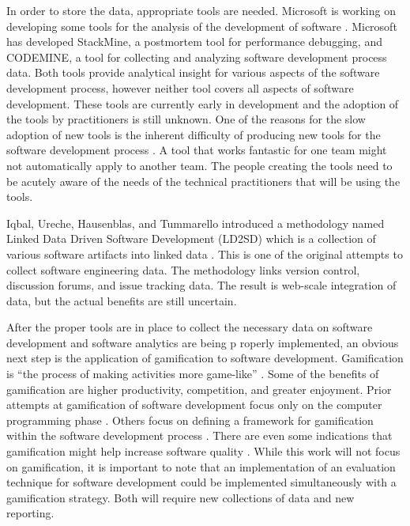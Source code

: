 \documentclass[SDSUThesis.tex]{subfiles}
\begin{document}
    In order to store the data, appropriate tools are needed.  Microsoft
    is working on developing some tools for the analysis of the development
    of software \cite{Czerwonka2013,Zhang2013}.  Microsoft has developed
    StackMine, a postmortem tool for performance debugging, and CODEMINE,
    a tool for collecting and analyzing software development process data.
    Both tools provide analytical insight for various aspects of the 
    software development process, however neither tool covers all aspects
    of software development.
    These tools are currently early in development and the adoption of the
    tools by practitioners is still unknown. One of the reasons for the slow
    adoption of new tools is the inherent difficulty of producing
    new tools for the software development process \cite{Spraragen2005}. A 
    tool that works fantastic for one team might not automatically apply to 
    another team.  The people creating the tools need to be acutely aware
    of the needs of the technical practitioners that will be using the
    tools.  
    
    Iqbal, Ureche, Hausenblas, and Tummarello introduced a methodology named
    Linked Data Driven Software Development (LD2SD) which is a collection
    of various software artifacts into linked data \cite{Iqbal2009}.  This
    is one of the original attempts to collect software engineering data.
    The methodology links version control, discussion forums, and issue tracking
    data. The result is web-scale integration of data, but the actual
    benefits are still uncertain. 

    After the proper tools are in place to collect the necessary
    data on software development and software analytics are being
    p roperly implemented, an obvious next step is the
    application of gamification to software development. Gamification
    is ``the process of making activities more game-like'' \cite{Werbach2014}.
    Some of the benefits of gamification are higher productivity, competition,
    and greater enjoyment.  
    Prior attempts
    at gamification of software development focus only on 
    the computer programming phase \cite{Snipes2013}. Others
    focus on defining a framework for gamification within
    the software development process \cite{Jain2013}. There are 
    even some indications that gamification might help increase
    software quality \cite{Dubois2013}. 
    While this work will not focus on gamification, it is important to note
    that an implementation of an evaluation technique for software
    development could be implemented simultaneously with a gamification
    strategy. Both will require new collections of data and new reporting.
\end{document}
